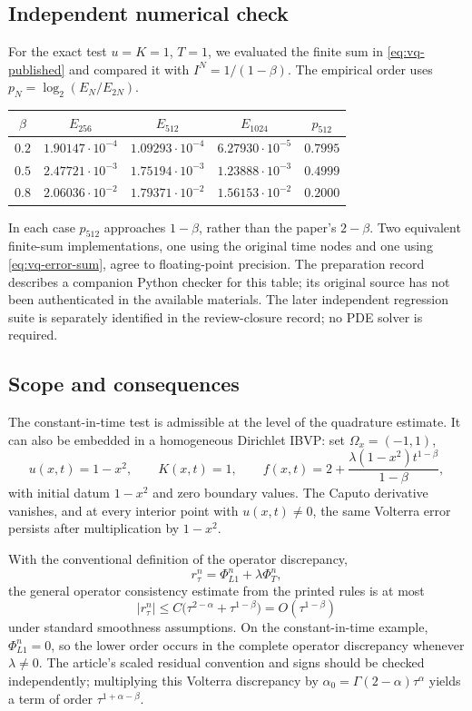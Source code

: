 \documentclass[11pt,a4paper]{amsart}
\theoremstyle{remark}
\theoremstyle{plain}
\theoremstyle{remark}
\numberwithin{equation}{section}
\begin{document}
\subsection{Independent numerical check}
For the exact test $u=K=1$, $T=1$, we evaluated the finite sum in
\eqref{eq:vq-published} and compared it with $I^N=1/(1-\beta)$.
The empirical order uses $p_N=\log_2(E_N/E_{2N})$.
\begin{center}
\small
\begin{tabular}{@{}ccccc@{}}
\hline
$\beta$ & $E_{256}$ & $E_{512}$ & $E_{1024}$ & $p_{512}$\\
\hline
$0.2$ & $1.90147\cdot10^{-4}$ & $1.09293\cdot10^{-4}$ & $6.27930\cdot10^{-5}$ & $0.7995$\\
$0.5$ & $2.47721\cdot10^{-3}$ & $1.75194\cdot10^{-3}$ & $1.23888\cdot10^{-3}$ & $0.4999$\\
$0.8$ & $2.06036\cdot10^{-2}$ & $1.79371\cdot10^{-2}$ & $1.56153\cdot10^{-2}$ & $0.2000$\\
\hline
\end{tabular}
\end{center}
In each case $p_{512}$ approaches $1-\beta$, rather than the paper's $2-\beta$.
Two equivalent finite-sum implementations, one using the original time nodes and one using \eqref{eq:vq-error-sum}, agree to floating-point precision. The preparation record describes a companion Python checker for this table; its original source has not been authenticated in the available materials. The later independent regression suite is separately identified in the review-closure record; no PDE solver is required.

\subsection{Scope and consequences}
The constant-in-time test is admissible at the level of the quadrature estimate. It can also be embedded in a homogeneous Dirichlet IBVP: set $\Omega_x=(-1,1)$,
\[
 u(x,t)=1-x^2,\qquad K(x,t)=1,\qquad
 f(x,t)=2+\frac{\lambda(1-x^2)t^{1-\beta}}{1-\beta},
\]
with initial datum $1-x^2$ and zero boundary values. The Caputo derivative vanishes, and at every interior point with $u(x,t)\ne0$, the same Volterra error persists after multiplication by $1-x^2$.

With the conventional definition of the operator discrepancy,
\[
 r_\tau^n=\Phi_{L1}^n+\lambda\Phi_T^n,
\]
the general operator consistency estimate from the printed rules is at most
\[
 |r_\tau^n|\le C\bigl(\tau^{2-\alpha}+\tau^{1-\beta}\bigr)
 =O(\tau^{1-\beta})
\]
under standard smoothness assumptions. On the constant-in-time example, $\Phi_{L1}^n=0$, so the lower order occurs in the complete operator discrepancy whenever $\lambda\ne0$. The article's scaled residual convention and signs should be checked independently; multiplying this Volterra discrepancy by
$\alpha_0=\Gamma(2-\alpha)\tau^\alpha$ yields a term of order
$\tau^{1+\alpha-\beta}$.
\end{document}
